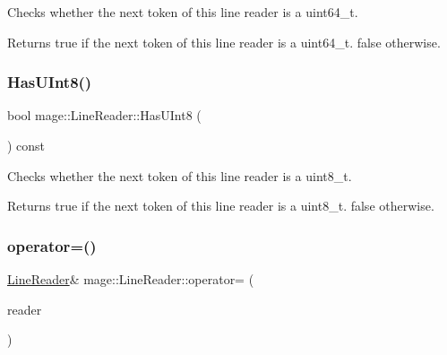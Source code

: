 Checks whether the next token of this line reader is a {\ttfamily uint64\+\_\+t}.

\begin{DoxyReturn}{Returns}
{\ttfamily true} if the next token of this line reader is a {\ttfamily uint64\+\_\+t}. {\ttfamily false} otherwise. 
\end{DoxyReturn}
\hypertarget{classmage_1_1_line_reader_a7d9359c8a65005358564728be9091fa8}{}\label{classmage_1_1_line_reader_a7d9359c8a65005358564728be9091fa8} 
\subsubsection{\texorpdfstring{Has\+U\+Int8()}{HasUInt8()}}
{\footnotesize\ttfamily bool mage\+::\+Line\+Reader\+::\+Has\+U\+Int8 (\begin{DoxyParamCaption}{ }\end{DoxyParamCaption}) const\hspace{0.3cm}{\ttfamily [protected]}}

Checks whether the next token of this line reader is a {\ttfamily uint8\+\_\+t}.

\begin{DoxyReturn}{Returns}
{\ttfamily true} if the next token of this line reader is a {\ttfamily uint8\+\_\+t}. {\ttfamily false} otherwise. 
\end{DoxyReturn}
\hypertarget{classmage_1_1_line_reader_a2247078d0b5602f9a9a6b74019832faf}{}\label{classmage_1_1_line_reader_a2247078d0b5602f9a9a6b74019832faf} 
\subsubsection{\texorpdfstring{operator=()}{operator=()}\hspace{0.1cm}{\footnotesize\ttfamily [1/2]}}
{\footnotesize\ttfamily \hyperlink{classmage_1_1_line_reader}{Line\+Reader}\& mage\+::\+Line\+Reader\+::operator= (\begin{DoxyParamCaption}\item[{const \hyperlink{classmage_1_1_line_reader}{Line\+Reader} \&}]{reader }\end{DoxyParamCaption})\hspace{0.3cm}{\ttfamily [delete]}}

